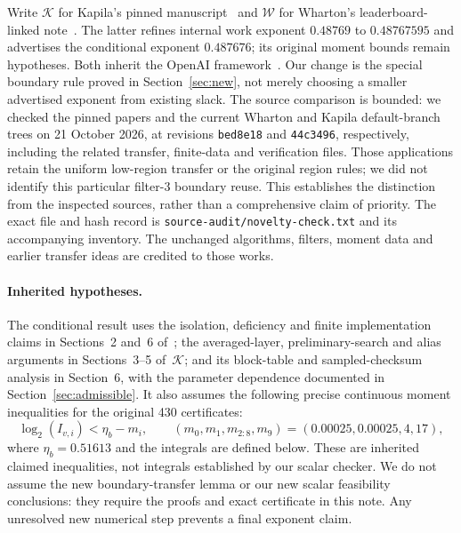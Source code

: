 \documentclass[11pt]{article}
\theoremstyle{remark}\newtheorem*{remark}{Scope}
\newcommand{\lgof}[1]{\log_2\!\left(#1\right)}
\begin{document}
Write $\mathcal K$ for Kapila's pinned manuscript~\cite{kapila} and
$\mathcal W$ for Wharton's leaderboard-linked note~\cite{wharton}.
The latter refines internal work exponent $0.48769$ to $0.48767595$
and advertises the conditional exponent $0.487676$; its original
moment bounds remain hypotheses. Both inherit the OpenAI framework~\cite{openai}.
Our change is the special boundary rule proved in Section~\ref{sec:new},
not merely choosing a smaller advertised exponent from existing slack.
The source comparison is bounded: we checked the pinned papers and the
current Wharton and Kapila default-branch trees on 21 October 2026,
at revisions \texttt{bed8e18} and \texttt{44c3496}, respectively,
including the related transfer, finite-data and verification files.
Those applications retain the uniform low-region transfer or the original
region rules; we did not identify this particular filter-3 boundary reuse.
This establishes the distinction from the inspected sources, rather than
a comprehensive claim of priority. The exact file and hash record is
\texttt{source-audit/novelty-check.txt} and its accompanying inventory.
The unchanged algorithms, filters, moment data and earlier transfer ideas
are credited to those works.

\paragraph{Inherited hypotheses.}
The conditional result uses the isolation, deficiency and finite
implementation claims in Sections~2 and~6 of~\cite{openai}; the
averaged-layer, preliminary-search and alias arguments in
Sections~3--5 of~$\mathcal K$; and its block-table and sampled-checksum
analysis in Section~6, with the parameter dependence documented in
Section~\ref{sec:admissible}. It also assumes the following precise
continuous moment inequalities for the original 430 certificates:
\begin{equation}\label{eq:oldmom}
 \lgof{I_{v,i}}<\eta_b-m_i,\qquad
 (m_0,m_1,m_{2:8},m_9)=(0.00025,0.00025,4,17),
\end{equation}
where $\eta_b=0.51613$ and the integrals are defined below.
These are inherited claimed inequalities, not integrals established by
our scalar checker. We do not assume the new boundary-transfer lemma
or our new scalar feasibility conclusions: they require the proofs and
exact certificate in this note. Any unresolved new numerical step prevents
a final exponent claim.
\end{document}
